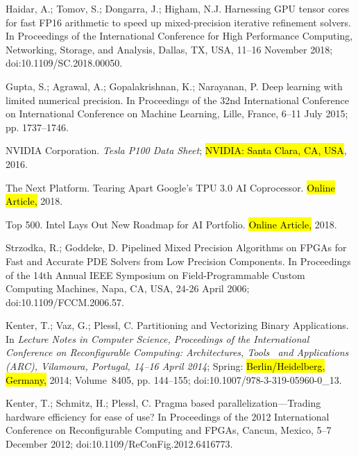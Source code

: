 \documentclass[computation,article,accept,moreauthors,pdftex]{Definitions/mdpi}
\begin{document}
\begin{thebibliography}{999}
Haidar, A.; Tomov, S.; Dongarra, J.; Higham, N.J.
\newblock Harnessing GPU tensor cores for fast FP16 arithmetic to speed up
 mixed-precision iterative refinement solvers.
\newblock In Proceedings of the International Conference for High Performance
 Computing, Networking, Storage, and Analysis, Dallas, TX, USA, 11--16 November 2018; doi:10.1109/SC.2018.00050.

Gupta, S.; Agrawal, A.; Gopalakrishnan, K.; Narayanan, P.
\newblock Deep learning with limited numerical precision.
\newblock In Proceedings of the 32nd International Conference on International
 Conference on Machine Learning, Lille, France, 6--11 July 2015; pp. 1737--1746.

{NVIDIA Corporation}.
\newblock \emph{Tesla {P100} Data Sheet}; \hl{NVIDIA: Santa Clara, CA, USA}, 2016.


{The Next Platform}.
\newblock Tearing Apart {Google's} {TPU} 3.0 {AI} Coprocessor.
\newblock \hl{Online Article,} 2018.

{Top 500}.
\newblock Intel Lays Out New Roadmap for {AI} Portfolio.
\newblock \hl{Online Article,} 2018.

Strzodka, R.; Goddeke, D.
\newblock Pipelined Mixed Precision Algorithms on FPGAs for Fast and Accurate
 PDE Solvers from Low Precision Components.
\newblock In Proceedings of the 14th Annual IEEE Symposium on Field-Programmable Custom Computing
 Machines, Napa, CA, USA, 24-26 April 2006; doi:10.1109/FCCM.2006.57.

Kenter, T.; Vaz, G.; Plessl, C.
\newblock Partitioning and Vectorizing Binary Applications.
\newblock In \emph{Lecture Notes in
 Computer Science, Proceedings of the International Conference on Reconfigurable Computing: Architectures, Tools~
 and Applications (ARC), Vilamoura, Portugal, 14--16 April 2014}; Spring: \hl{Berlin/Heidelberg, Germany,} %
 2014;
Volume~8405, pp. 144--155; doi:10.1007/978-3-319-05960-0\_13.

Kenter, T.; Schmitz, H.; Plessl, C.
\newblock Pragma based parallelization---Trading hardware efficiency for ease
 of use?
\newblock In Proceedings of the 2012 International Conference on Reconfigurable Computing and FPGAs, Cancun, Mexico, 5--7 December 2012; doi:10.1109/ReConFig.2012.6416773.


\end{thebibliography}
\end{document}
